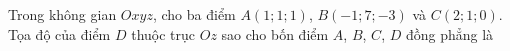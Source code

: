 \begin{ex}
Trong không gian $Oxyz$, cho ba điểm $A(1;1;1)$, $B(-1;7;-3)$ và $C(2;1;0)$. Tọa độ của điểm $D$ thuộc trục $Oz$ sao cho bốn điểm $A$, $B$, $C$, $D$ đồng phẳng là
\end{ex}
